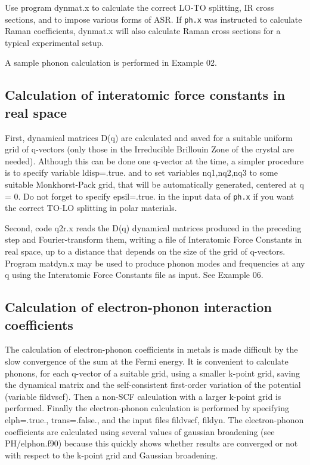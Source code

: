 \documentclass[12pt,a4paper]{article}
\def\ph.x{\texttt{ph.x}}
\begin{document}
Use program dynmat.x to calculate the correct LO-TO splitting, IR cross
sections, and to impose various forms of ASR. If \ph.x was instructed to 
calculate Raman coefficients, dynmat.x will also calculate Raman cross sections
for a typical experimental setup.
    
A sample phonon calculation is performed in Example 02.

\subsection{Calculation of interatomic force constants in real space}

First, dynamical matrices D(q) are calculated and saved for a suitable uniform 
grid of q-vectors (only those in the Irreducible Brillouin Zone of the
crystal are needed). Although this can be done one q-vector at the time, a
simpler procedure is to specify variable ldisp=.true. and to set variables
nq1,nq2,nq3 to some suitable Monkhorst-Pack grid, that will be automatically
generated, centered at q = 0. Do not forget to specify epsil=.true.
in the input data of \ph.x if you want the correct TO-LO splitting in polar
materials.
    
Second, code q2r.x reads the D(q) dynamical matrices produced in the
preceding step and Fourier-transform them, writing a file of Interatomic Force
Constants in real space, up to a distance that depends on the size of the grid
of q-vectors. Program matdyn.x may be used to produce phonon modes and
frequencies at any q using the Interatomic Force Constants file as input.
See Example 06.

\subsection{Calculation of electron-phonon interaction coefficients}

The calculation of electron-phonon coefficients in metals is made difficult by
the slow convergence of the sum at the Fermi energy. It is convenient to 
calculate phonons, for each q-vector of a suitable grid, using a
smaller k-point 
grid, saving the dynamical matrix and the self-consistent first-order variation
of the potential (variable fildvscf). Then a non-SCF calculation with
a larger k-point grid is performed. Finally the electron-phonon calculation is
performed by specifying elph=.true., trans=.false., and the input files
fildvscf, fildyn. The electron-phonon coefficients are calculated using several
values of gaussian broadening (see PH/elphon.f90) because this quickly
shows whether results are converged or not with respect to the k-point grid
and Gaussian broadening. 
\end{document}

